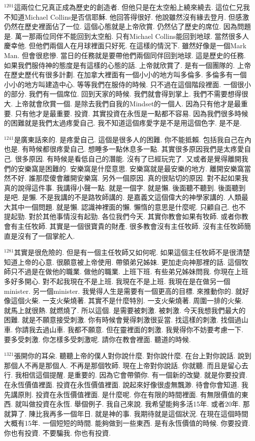 \documentclass{book}
\begin{document}
$^{1201}$這兩位仁兄真正成為歷史的創造者.
但他只是在太空船上繞來繞去.
這位仁兄我不知道Michael Collins是否信耶穌.
他回答得很好.
他說雖然沒有緣去登月.
但感激仍然在歷史裡面佔了一位.
這個心態就是上帝欣賞.
仍然佔了歷史的席位.
因為問題是.
萬一那兩位同伴不能回到太空船.
只有Michael Collins能回到地球.
當然很多人慶幸他.
但他們兩個人在月球裡面只好死.
在這樣的情況下.
雖然好像是一個Mark Man.
但會很悲慘.
當日的任務就是要帶他們兩個同伴回到地球.
這是歷史的任務.
如果我們服侍神的態度是有這樣的心態的話.
上帝就欣賞了.
是有一個團隊的.
上帝在歷史歷代有很多計劃.
在加拿大裡面有一個小小的地方叫多倫多.
多倫多有一個小小的地方叫建造中心.
等等我們在服侍的時候.
只不過在這個階段裡面.
一個很小的部分.
我們有一個席位.
回到天家的時候.
我們就會得到掌上.
我們不需要想得很大.
上帝就會欣賞一個.
是除去我們自我的Mindset的一個人.
因為只有他才是最重要.
只有他才是最重要.
投資.
其實投資在永恆是一點都不容易.
因為我們很多時候的困難就是我們太過疼愛自己.
我不知道這個疼愛字是不是用這個色字.
是不是.

$^{1241}$是廣東話來的.
是疼愛自己.
這個是很多人的困難.
你不能抵賴.
包括我自己在內也是.
有時候都很疼愛自己.
想睡多一點休息多一點.
其實很多原因我們是太疼愛自己.
很多原因.
有時候是看低自己的潛能.
沒有了已經玩完了.
又或者是覺得離開我們的安樂窩是困難的.
安樂窩是什麼意思.
安樂窩就是最安樂的地方.
離開安樂窩當然不好.
誰那麼傻會離開安樂窩.
另外一個原因.
真的很貼切的原因.
對不起如果我真的說得這件事.
我講得小聲一點.
就是一個字.
就是懶.
後面聽不聽到.
後面聽到是吧.
是懶.
不是我講的不是路牧師講的.
是嘉義文這個偉大的神學家講的.
人類最大其中一個問題.
就是懶.
認識神裡面的懶.
懶惰的意思是什麼呢.
只顧自己.
也不提起勁.
對於其他事情沒有起勁.
各位我們今天.
其實你教會如果有牧師.
或者你教會有主任牧師.
其實是一個很寶貴的財產.
很多教會沒有主任牧師.
沒有主任牧師簡直是沒有了一個掌舵人.

$^{1281}$其實是很危險的.
但是有一個主任牧師又如何呢.
如果這個主任牧師不是很清楚知道上帝的心意.
很願意被上帝使用.
帶領弟兄姊妹.
更加走向神那裡的話.
這個牧師只不過是在做他的職業.
做他的職業.
上班下班.
有些弟兄姊妹問我.
你現在上班多好多開心.
對不起我現在不是上班.
我現在不是上班.
我現在是在做另一個minister.
另一個minister.
我覺得人生是需要有一個更高的目標.
來推動你的.
就好像這個火柴.
一支火柴燒著.
其實不是什麼特別.
一支火柴燒著.
周圍一排的火柴.
就馬上就很熱.
就燃燒了.
所以這個.
是需要被刺激.
被刺激.
今天我想我們最大的困難.
就是不願意接受刺激.
你有時候會覺得刺激很妥當.
找這樣的刺激.
找個過山車.
你請我去過山車.
我都不願意.
但在靈裡面的刺激.
我覺得你不妨要考慮一下.
要多受刺激.
你怎樣多受刺激呢.
請你在教會裡面.
聽道的時候.

$^{1321}$張開你的耳朵.
聽聽上帝的僕人對你說什麼.
對你說什麼.
在台上對你說話.
說到那個人不再是那個人.
不再是那個牧師.
現在上帝對你說話.
你就聽.
而且是留心去行.
我相信這個提醒.
是重要的.
因為它會帶領你.
有一個新的改變.
就是你要投資.
在永恆價值裡面.
投資在永恆價值裡面.
說起來好像很虛無飄渺.
待會你會知道.
我先講原則.
投資在永恆價值裡面.
是什麼呢.
你在有限的時間裡面.
有無限價值的東西.
就叫做投資在永恆.
舉個例子.
我自己來說.
我希望能夠多活15年.
或者20年.
那就算了.
陳比我再多一個年日.
就是神的事.
我期待就是這個狀況.
在現在這個時間大概有15年.
一個短短的時間.
能夠做到一些東西.
是有永恆價值的時候.
你要投資.
你也有投資.
不要騙我.
你也有投資.
\end{document}
